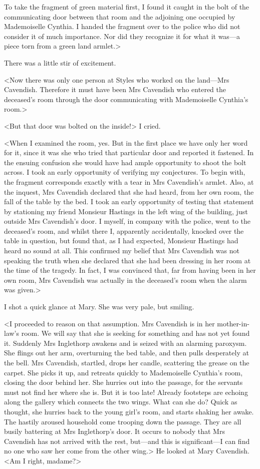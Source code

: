  To take the fragment of green material first, I found it caught in the bolt of the communicating door between that room and the adjoining one occupied by Mademoiselle Cynthia. I handed the fragment over to the police who did not consider it of much importance. Nor did they recognize it for what it was—a piece torn from a green land armlet.> 

 There was a little stir of excitement. 

 <Now there was only one person at Styles who worked on the land—Mrs Cavendish. Therefore it must have been Mrs Cavendish who entered the deceased's room through the door communicating with Mademoiselle Cynthia's room.> 

 <But that door was bolted on the inside!> I cried. 

 <When I examined the room, yes. But in the first place we have only her word for it, since it was she who tried that particular door and reported it fastened. In the ensuing confusion she would have had ample opportunity to shoot the bolt across. I took an early opportunity of verifying my conjectures. To begin with, the fragment corresponds exactly with a tear in Mrs Cavendish's armlet. Also, at the inquest, Mrs Cavendish declared that she had heard, from her own room, the fall of the table by the bed. I took an early opportunity of testing that statement by stationing my friend Monsieur Hastings in the left wing of the building, just outside Mrs Cavendish's door. I myself, in company with the police, went to the deceased's room, and whilst there I, apparently accidentally, knocked over the table in question, but found that, as I had expected, Monsieur Hastings had heard no sound at all. This confirmed my belief that Mrs Cavendish was not speaking the truth when she declared that she had been dressing in her room at the time of the tragedy. In fact, I was convinced that, far from having been in her own room, Mrs Cavendish was actually in the deceased's room when the alarm was given.> 

 I shot a quick glance at Mary. She was very pale, but smiling. 

 <I proceeded to reason on that assumption. Mrs Cavendish is in her mother-in-law's room. We will say that she is seeking for something and has not yet found it. Suddenly Mrs Inglethorp awakens and is seized with an alarming paroxysm. She flings out her arm, overturning the bed table, and then pulls desperately at the bell. Mrs Cavendish, startled, drops her candle, scattering the grease on the carpet. She picks it up, and retreats quickly to Mademoiselle Cynthia's room, closing the door behind her. She hurries out into the passage, for the servants must not find her where she is. But it is too late! Already footsteps are echoing along the gallery which connects the two wings. What can she do? Quick as thought, she hurries back to the young girl's room, and starts shaking her awake. The hastily aroused household come trooping down the passage. They are all busily battering at Mrs Inglethorp's door. It occurs to nobody that Mrs Cavendish has not arrived with the rest, but—and this is significant—I can find no one who saw her come from the other wing.> He looked at Mary Cavendish. <Am I right, madame?> 

